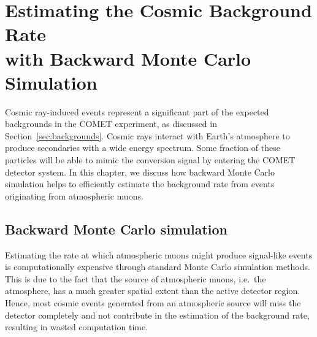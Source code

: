 \chapter[Estimating the Cosmic Background Rate with Backward Monte Carlo
Simulation]{Estimating the Cosmic Background Rate \\with Backward Monte Carlo
Simulation}\label{ch:cosmics}








Cosmic ray-induced events represent a significant part of the expected
backgrounds in the COMET experiment, as discussed in
Section~\ref{sec:backgrounds}. Cosmic rays interact with Earth's atmosphere to
produce secondaries with a wide energy spectrum. Some fraction of these
particles will be able to mimic the conversion signal by entering the COMET
detector system. In this chapter, we discuss how backward Monte Carlo simulation
helps to efficiently estimate the background rate from events originating from
atmospheric muons.

\section{Backward Monte Carlo simulation}\label{sec:bmc_method}

Estimating the rate at which atmospheric muons might produce signal-like events is
computationally expensive through standard Monte Carlo simulation methods. This
is due to the fact that the source of atmospheric muons, i.e.\ the atmosphere, has a
much greater spatial extent than the active detector region. Hence, most cosmic
events generated from an atmospheric source will miss the detector completely
and not contribute in the estimation of the background rate, resulting in wasted
computation time.

